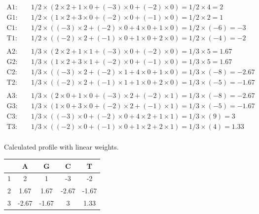 $\begin{aligned}
\mathrm{A1}: & \quad 1/2 \times (2 \times 2 + 1 \times 0 + (-3) \times 0 + (-2) \times 0) = 1/2 \times 4 = 2 \\
\mathrm{G1}: & \quad 1/2 \times (1 \times 2 + 3 \times 0 + (-2) \times 0 + (-1) \times 0) = 1/2 \times 2 = 1 \\
\mathrm{C1}: & \quad 1/2 \times ((-3) \times 2 + (-2) \times 0 + 4 \times 0 + 1 \times 0) = 1/2 \times (-6) = -3 \\
\mathrm{T1}: & \quad 1/2 \times ((-2) \times 2 + (-1) \times 0 + 1 \times 0 + 2 \times 0) = 1/2 \times (-4) = -2 \\ \\
\mathrm{A2}: & \quad 1/3 \times (2 \times 2 + 1 \times 1+(-3) \times 0+(-2) \times 0) = 1/3 \times 5=1.67 \\
\mathrm{G2}: & \quad 1/3 \times (1 \times 2 + 3 \times 1+(-2) \times 0+(-1) \times 0) = 1/3 \times 5=1.67 \\
\mathrm{C2}: & \quad 1/3 \times ((-3) \times 2 + (-2) \times 1+4 \times 0+1 \times 0) = 1/3 \times (-8) = -2.67 \\
\mathrm{T2}: & \quad 1/3 \times ((-2) \times 2 + (-1) \times 1+1 \times 0+2 \times 0) = 1/3 \times (-5) = -1.67 \\ \\
\mathrm{A3}: & \quad 1/3 \times (2 \times 0 + 1 \times 0 + (-3) \times 2 + (-2) \times 1) = 1/3 \times (-8) = -2.67 \\
\mathrm{G3}: & \quad 1/3 \times (1 \times 0 + 3 \times 0 + (-2) \times 2 + (-1) \times 1) = 1/3 \times (-5) = -1.67 \\
\mathrm{C3}: & \quad 1/3 \times ((-3) \times 0 + (-2) \times 0 + 4 \times 2 + 1 \times 1) = 1/3 \times (9) = 3 \\
\mathrm{T3}: & \quad 1/3 \times ((-2) \times 0 + (-1) \times 0 + 1 \times 2 + 2 \times 1) = 1/3 \times (4) = 1.33 \\
\end{aligned} $

\bigskip \bigskip 

\noindent
Calculated profile with linear weights.

\begin{table}[H]
\centering
\begin{tabular}{|c|c|c|c|c|}
\hline
  & A     & G     & C     & T     \\ \hline
1 & 2     & 1     & -3    & -2    \\ \hline
2 & 1.67  & 1.67  & -2.67 & -1.67 \\ \hline
3 & -2.67 & -1.67 & 3     & 1.33  \\ \hline
\end{tabular}
\end{table}

